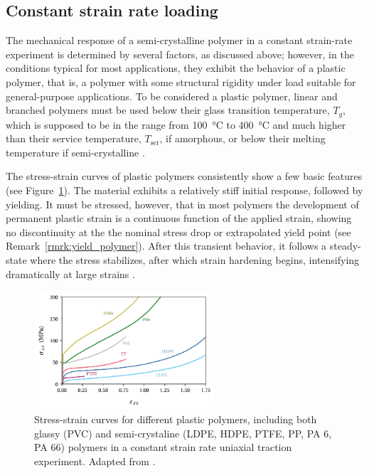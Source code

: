 \subsection{Constant strain rate loading}

The mechanical response of a semi-crystalline polymer in a constant strain-rate experiment is determined by several factors, as discussed above; however, in the conditions typical for most applications, they exhibit the behavior of a plastic polymer, that is, a polymer with some structural rigidity under load suitable for general-purpose applications.
To be considered a plastic polymer, linear and branched polymers must be used below their glass transition temperature, $T_g$, which is supposed to be in the range from \SI{100}{\celsius} to \SI{400}{\celsius} and much higher than their service temperature, $T_\mathrm{ser}$, if amorphous, or below their melting temperature if semi-crystalline \citep{callister2014materials, arzhakovRelaxationPhysicalMechanical2019}.

The stress-strain curves of plastic polymers consistently show a few basic features (see Figure~\ref{fig:response_plastic_polymer}).
The material exhibits a relatively stiff initial response, followed by yielding.
It must be stressed, however, that in most polymers the development of permanent plastic strain is a continuous function of the applied strain, showing no discontinuity at the the nominal stress drop or extrapolated yield point \citep{wardReviewYieldBehaviour1971} (see Remark~\ref{rmrk:yield_polymer}).
After this transient behavior, it follows a steady-state where the stress stabilizes, after which strain hardening begins, intensifying dramatically at large strains \citep{hissNetworkStretchingSlip1999,callister2014materials,makradiTwophaseSelfconsistentModel2005}.
\begin{figure}[hbp]
	\centering
	\includegraphics[width=0.6\textwidth, scale=0.25]{figures/response_plastic_polymer}
	\caption{Stress-strain curves for different plastic polymers, including both glassy (PVC) and semi-crystaline (LDPE, HDPE, PTFE, PP, PA 6, PA 66) polymers in a constant strain rate uniaxial traction experiment. Adapted from \cite{gsellYieldTransientEffects1981}.}
\label{fig:response_plastic_polymer}
\end{figure}

